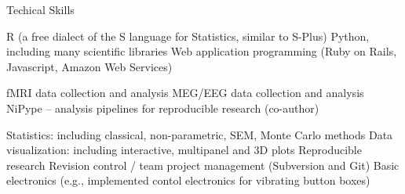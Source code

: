 \begin{rubric}{Techical Skills}

\entry* R (a free dialect of the S language for Statistics, similar to S-Plus)
\entry* Python, including many scientific libraries
\entry* Web application programming (Ruby on Rails, Javascript, Amazon Web
Services)

\entry* fMRI data collection and analysis
\entry* MEG/EEG data collection and analysis
\entry* NiPype -- analysis pipelines for reproducible research (co-author)

\entry* Statistics: including classical, non-parametric, SEM, Monte Carlo methods
\entry* Data visualization: including interactive, multipanel and 3D plots
\entry* Reproducible research
\entry* Revision control / team project management (Subversion and Git)
\entry* Basic electronics (e.g., implemented contol electronics for vibrating button
boxes)

\end{rubric}
